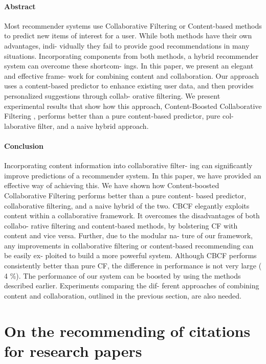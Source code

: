 \documentclass[oneside]{book}
\begin{document}
\paragraph{Abstract}
Most  recommender  systems  use  Collaborative  Filtering  or
Content-based  methods  to predict  new  items of interest for
a user.  While both methods have their own advantages, indi-
vidually they fail to provide good recommendations in many
situations.  Incorporating components from both methods, a
hybrid recommender system can overcome these shortcom-
ings. In this paper, we present an elegant and effective frame-
work for combining content and collaboration. Our approach
uses a content-based predictor to enhance existing user data,
and then provides  personalized  suggestions  through  collab-
orative filtering.  We present experimental results that show
how this approach,
Content-Boosted Collaborative Filtering
,
performs better than a pure content-based predictor, pure col-
laborative filter, and a naive hybrid approach.

\paragraph{Conclusion}

Incorporating content information into collaborative filter-
ing can significantly improve predictions of a recommender
system.   In this paper, we have provided an effective way
of  achieving  this.   We  have  shown  how  Content-boosted
Collaborative Filtering performs better than a pure content-
based predictor, collaborative filtering, and a naive hybrid of
the two.
CBCF  elegantly  exploits  content  within  a  collaborative
framework. It overcomes the disadvantages of both collabo-
rative filtering and content-based methods, by bolstering CF
with content and vice versa. Further, due to the modular na-
ture of our framework, any improvements in collaborative
filtering or content-based recommending can be easily ex-
ploited to build a more powerful system.
Although
CBCF  performs  consistently  better  than  pure
CF,  the  difference in  performance is  not  very  large (
4
\%).
The performance of our system can be boosted by using the
methods described earlier.  Experiments comparing the dif-
ferent approaches of combining content and collaboration,
outlined in the previous section, are also needed.

\section{On the recommending of citations for research papers}
\end{document}

